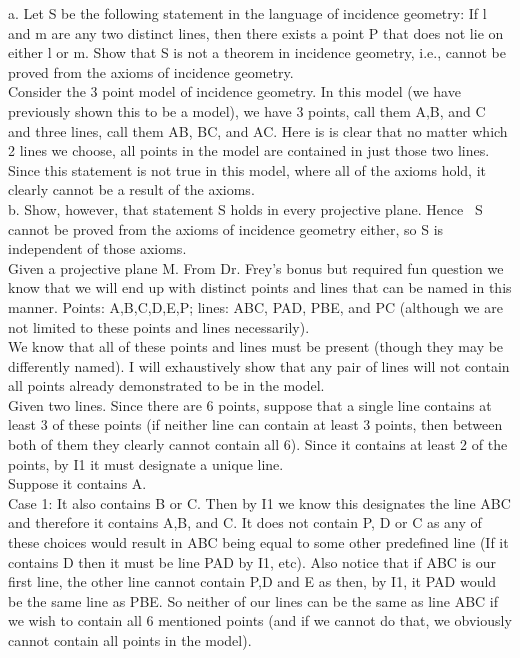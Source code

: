 \documentclass[12pt,letterpaper]{article}
\newcommand{\prob}[1]{\newpage\noindent {\bf #1}}
\begin{document}
\prob{14}  

a. Let S be the following statement in the language of incidence geometry:  If l and m are any two distinct lines, then there exists a point P that does not lie on either l or m.  Show that S is not a theorem in incidence geometry, i.e., cannot be proved from the axioms of incidence geometry.\\

Consider the 3 point model of incidence geometry.  In this model (we have previously shown this to be a model), we have 3 points, call them A,B, and C and three lines, call them AB, BC, and AC.  Here is is clear that no matter which 2 lines we choose, all points in the model are contained in just those two lines.  Since this statement is not true in this model, where all of the axioms hold, it clearly cannot be a result of the axioms.\\



b. Show, however, that statement S holds in every projective plane.  Hence ~S cannot be proved from the axioms of incidence geometry either, so S is independent of those axioms.\\

Given a projective plane M.  From Dr. Frey's bonus but required fun question we know that we will end up with distinct points and lines that can be named in this manner.  Points: A,B,C,D,E,P; lines: ABC, PAD, PBE, and PC (although we are not limited to these points and lines necessarily). \\ 

We know that all of these points and lines must be present (though they may be differently named).  I will exhaustively show that any pair of lines will not contain all points already demonstrated to be in the model.\\

Given two lines. Since there are 6 points, suppose that a single line contains at least 3 of these points (if neither line can contain at least 3 points, then between both of them they clearly cannot contain all 6).  Since it contains at least 2 of the points, by I1 it must designate a unique line.  \\

Suppose it contains A.\\

Case 1: It also contains B or C.  Then by I1 we know this designates the line ABC and therefore it contains A,B, and C.  It does not contain P, D or C as any of these choices would result in ABC being equal to some other predefined line (If it contains D then it must be line PAD by I1, etc).  Also notice that if ABC is our first line, the other line cannot contain P,D and E as then, by I1, it PAD would be the same line as PBE. So neither of our lines can be the same as line ABC if we wish to contain all 6 mentioned points (and if we cannot do that, we obviously cannot contain all points in the model).\\
\end{document}
